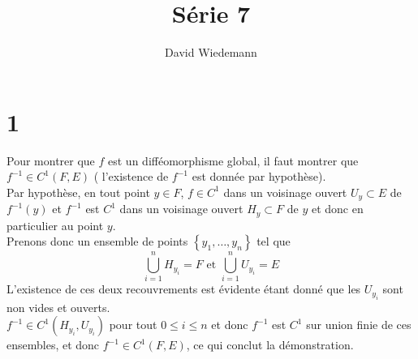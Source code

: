 \documentclass[11pt, a4paper]{article}
\begin{document}
\title{Série 7}
\author{David Wiedemann}
\maketitle
\section*{1}
Pour montrer que $f$ est un difféomorphisme global, il faut montrer que $f^{-1} \in C^{1}( F,E) $ ( l'existence de $f^{-1}$ est donnée par hypothèse).\\
Par hypothèse, en tout point $y\in F$, $f \in C^{1}$ dans un voisinage ouvert $U_y \subset E$ de $f^{-1}( y) $ et $f^{-1}$ est $C^{1}$ dans un voisinage ouvert $H_y \subset F$ de $y$ et donc en particulier au point $y$.\\
Prenons donc un ensemble de points $ \left\{ y_1, \ldots, y_n \right\} $ tel que 
\[ 
\bigcup_{i=1}^{n} H_{y_i}  = F \text{ et } \bigcup_{i=1}^{n} U_{y_i} =E		
\]
L'existence de ces deux recouvrements est évidente étant donné que les $U_{y_i} $ sont non vides et ouverts.\\
$f^{-1} \in C^{1}( H_{y_i}, U_{y_i} ) $ pour tout $ 0 \leq i \leq n$ et donc $f^{-1}$ est $C^{1}$ sur union finie de ces ensembles, et donc $f^{-1}\in C^{1}( F,E) $, ce qui conclut la démonstration.
\end{document}
